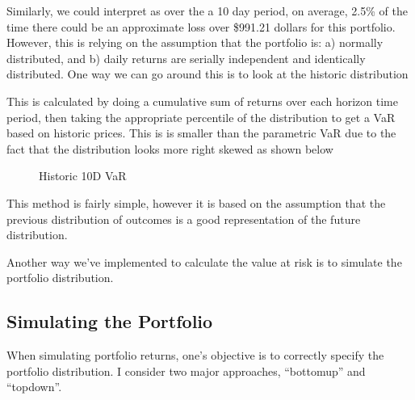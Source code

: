 \documentclass[letterpaper,10pt,english]{sphinxmanual}
\begin{document}
\sphinxAtStartPar
Similarly, we could interpret as over the a 10 day period, on average,
2.5\% of the time there could be an approximate loss over \$991.21 dollars
for this portfolio. However, this is relying on the assumption that the
portfolio is: a) normally distributed, and b) daily returns are serially
independent and identically distributed. One way we can go around this
is to look at the historic distribution

\begin{sphinxVerbatim}[commandchars=\\\{\}]
   
\end{sphinxVerbatim}

\sphinxAtStartPar
This is calculated by doing a cumulative sum of returns over each
horizon time period, then taking the appropriate percentile of the
distribution to get a VaR based on historic prices. This is is smaller
than the parametric VaR due to the fact that the distribution looks more
right skewed as shown below

\begin{figure}[htbp]
\centering
\capstart

\noindent{}
\caption{Historic 10D VaR}\label{\detokenize{gettingstarted:id3}}\end{figure}

\sphinxAtStartPar
This method is fairly simple, however it is based on the assumption that
the previous distribution of outcomes is a good representation of the
future distribution.

\sphinxAtStartPar
Another way we’ve implemented to calculate the value at risk is to
simulate the portfolio distribution.


\subsection{Simulating the Portfolio}
\label{\detokenize{gettingstarted:simulating-the-portfolio}}
\sphinxAtStartPar
When simulating portfolio returns, one’s objective is to correctly
specify the portfolio distribution. I consider two major approaches,
“bottom\sphinxhyphen{}up” and “top\sphinxhyphen{}down”.
\end{document}
